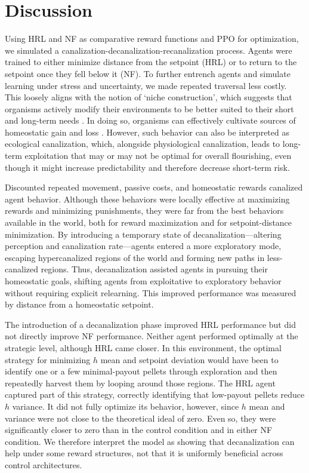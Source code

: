 \section{Discussion}\label{model-discussion}

Using HRL and NF as comparative reward functions and PPO for optimization, we simulated a canalization-decanalization-recanalization process. Agents were trained to either minimize distance from the setpoint (HRL) or to return to the setpoint once they fell below it (NF). To further entrench agents and simulate learning under stress and uncertainty, we made repeated traversal less costly. This loosely aligns with the notion of ‘niche construction’, which suggests that organisms actively modify their environments to be better suited to their short and long-term needs \cite{pio-lopez_scale-free_2025}. In doing so, organisms can effectively cultivate sources of homeostatic gain and loss \cite{lyon_reframing_2021}. However, such behavior can also be interpreted as ecological canalization, which, alongside physiological canalization, leads to long-term exploitation that may or may not be optimal for overall flourishing, even though it might increase predictability and therefore decrease short-term risk.

Discounted repeated movement, passive costs, and homeostatic rewards canalized agent behavior. Although these behaviors were locally effective at maximizing rewards and minimizing punishments, they were far from the best behaviors available in the world, both for reward maximization and for setpoint-distance minimization. By introducing a temporary state of decanalization—altering perception and canalization rate—agents entered a more exploratory mode, escaping hypercanalized regions of the world and forming new paths in less-canalized regions. Thus, decanalization assisted agents in pursuing their homeostatic goals, shifting agents from exploitative to exploratory behavior without requiring explicit relearning. This improved performance was measured by distance from a homeostatic setpoint.

The introduction of a decanalization phase improved HRL performance but did not directly improve NF performance. Neither agent performed optimally at the strategic level, although HRL came closer. In this environment, the optimal strategy for minimizing \(h\) mean and setpoint deviation would have been to identify one or a few minimal-payout pellets through exploration and then repeatedly harvest them by looping around those regions. The HRL agent captured part of this strategy, correctly identifying that low-payout pellets reduce \(h\) variance. It did not fully optimize its behavior, however, since \(h\) mean and variance were not close to the theoretical ideal of zero. Even so, they were significantly closer to zero than in the control condition and in either NF condition. We therefore interpret the model as showing that decanalization can help under some reward structures, not that it is uniformly beneficial across control architectures.

